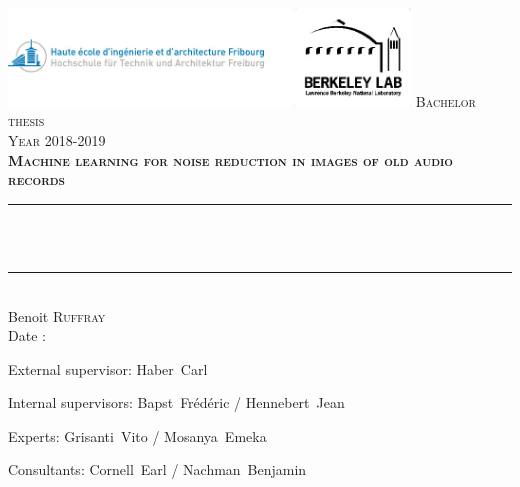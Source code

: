 \begin{titlepage}

\newcommand{\HRule}{\rule{\linewidth}{0.5mm}} %

\center %


\includegraphics[width=0.8\textwidth]{../images/both_logo.jpg}
\textsc{\Large Bachelor thesis \\ [0.3cm]
\large Year 2018-2019 }\\ [2.0cm]


\textsc{
\bfseries \LARGE Machine learning for noise reduction in images of old audio records}\\ [1.0cm]


\HRule \\[0.5cm]
{ \huge \bfseries \Title }\\ 
\HRule \\[1.2cm]

\Large
Benoit \textsc{Ruffray}\\[1.0cm] 

{\large Date : \daterendu}\\[1.3cm] 

\begin{flushleft}
\large External supervisor: Haber~Carl
\end{flushleft}
\begin{flushleft}
	\large Internal supervisors: Bapst~Frédéric / Hennebert~Jean
\end{flushleft}
\begin{flushleft}
	\large Experts: Grisanti~Vito / Mosanya~Emeka
\end{flushleft}
\begin{flushleft}
\large Consultants: Cornell~Earl / Nachman~Benjamin
\end{flushleft}

\end{titlepage}